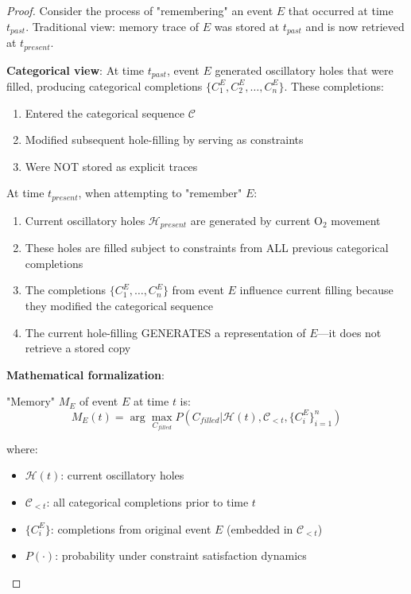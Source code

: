 \documentclass[11pt,a4paper]{article}
\begin{document}
\begin{proof}
Consider the process of "remembering" an event $E$ that occurred at time $t_{past}$. Traditional view: memory trace of $E$ was stored at $t_{past}$ and is now retrieved at $t_{present}$.

\textbf{Categorical view}: At time $t_{past}$, event $E$ generated oscillatory holes that were filled, producing categorical completions $\{C_1^E, C_2^E, \ldots, C_n^E\}$. These completions:
\begin{enumerate}
\item Entered the categorical sequence $\mathcal{C}$
\item Modified subsequent hole-filling by serving as constraints
\item Were NOT stored as explicit traces
\end{enumerate}

At time $t_{present}$, when attempting to "remember" $E$:
\begin{enumerate}
\item Current oscillatory holes $\mathcal{H}_{present}$ are generated by current O$_2$ movement
\item These holes are filled subject to constraints from ALL previous categorical completions
\item The completions $\{C_1^E, \ldots, C_n^E\}$ from event $E$ influence current filling because they modified the categorical sequence
\item The current hole-filling GENERATES a representation of $E$—it does not retrieve a stored copy
\end{enumerate}

\textbf{Mathematical formalization}:

"Memory" $M_E$ of event $E$ at time $t$ is:
\begin{equation}
M_E(t) = \arg\max_{C_{filled}} P(C_{filled} | \mathcal{H}(t), \mathcal{C}_{< t}, \{C_i^E\}_{i=1}^{n})
\end{equation}

where:
\begin{itemize}
\item $\mathcal{H}(t)$: current oscillatory holes
\item $\mathcal{C}_{< t}$: all categorical completions prior to time $t$
\item $\{C_i^E\}$: completions from original event $E$ (embedded in $\mathcal{C}_{< t}$)
\item $P(\cdot)$: probability under constraint satisfaction dynamics
\end{itemize}


\end{proof}
\end{document}
